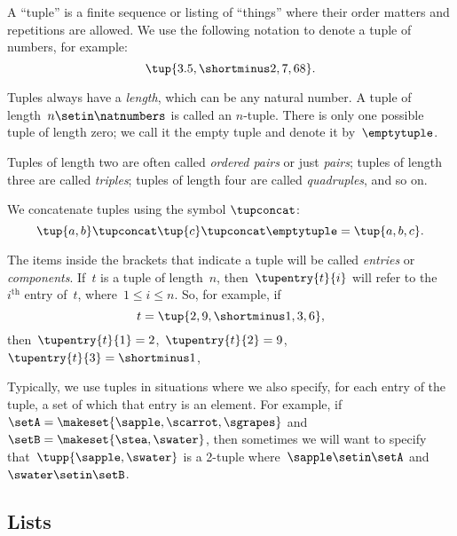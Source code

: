 A ``tuple'' is a finite sequence or listing of ``things'' where their order matters and repetitions are allowed.
We use the following notation to denote a tuple of numbers, for example:
\begin{equation}
    \tup{3.5, \shortminus 2, 7, 68}.
\end{equation}

Tuples always have a \emph{length}, which can be any natural number.
A tuple of length~$n \setin \natnumbers$ is called an $n$-tuple.
There is only one possible tuple of length zero; we call it the empty tuple and denote it by~$\emptytuple$.

Tuples of length two are often called \emph{ordered pairs} or just \emph{pairs};
tuples of length three are called \emph{triples};
tuples of length four are called \emph{quadruples}, and so on.

We concatenate tuples using the symbol $\tupconcat$:
\begin{equation}
    \tup{a,b} \tupconcat \tup{c} \tupconcat \emptytuple = \tup{a,b,c}.
\end{equation}

The items inside the brackets that indicate a tuple will be called \emph{entries} or \emph{components}.
If~$t$ is a tuple of length~$n$, then~$\tupentry{t}{i}$ will refer to the~$i^{\text{th}}$ entry of~$t$, where~$1 \leq i \leq n$.
So, for example, if
\begin{equation}
    t = \tup{2,9,\shortminus1, 3, 6},
\end{equation}
then~$\tupentry{t}{1} = 2$,~$\tupentry{t}{2} = 9$,~$\tupentry{t}{3} = \shortminus1$, \etc

Typically, we use tuples in situations where we also specify, for each entry of the tuple, a set of which that entry is an element.
For example, if~$\setA = \makeset{ \sapple, \scarrot, \sgrapes}$ and~$\setB = \makeset{ \stea, \swater }$, then sometimes we will want to specify that~$\tupp{\sapple, \swater}$ is a 2-tuple where~$\sapple \setin\setA$ and~$\swater \setin\setB$.


\subsection{Lists}
\label{sec:lists}

